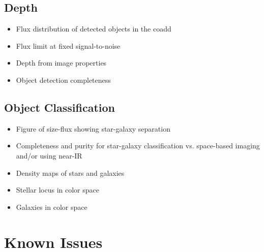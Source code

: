 \subsection{Depth}



\begin{itemize}

\item Flux distribution of detected objects in the coadd

\item Flux limit at fixed signal-to-noise

\item Depth from image properties

\item Object detection completeness

\end{itemize}

\subsection{Object Classification}

\begin{itemize}

\item Figure of size-flux showing star-galaxy separation

\item Completeness and purity for star-galaxy classification vs. space-based imaging and/or using near-IR

\item Density maps of stars and galaxies

\item Stellar locus in color space

\item Galaxies in color space

\end{itemize}

\section {Known Issues}


